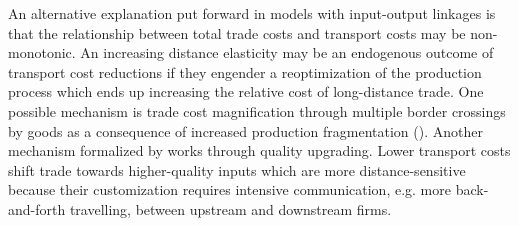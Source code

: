 \documentclass[12pt,twoside,a4paper,notitlepage]{article}
\begin{document}
An alternative explanation put forward in models with input-output linkages is that the relationship between total trade costs and transport costs may be non-monotonic. An increasing distance elasticity may be an endogenous outcome of transport cost reductions if they engender a reoptimization of the production process which ends up increasing the relative cost of long-distance trade. One possible mechanism is trade cost magnification through multiple border crossings by goods as a consequence of increased production fragmentation (\cite{Yi2010,Daudin2011,Noguera2012}). Another mechanism formalized by \cite{Duranton2008} works through quality upgrading. Lower transport costs shift trade towards higher-quality inputs which are more distance-sensitive because their customization requires intensive communication, e.g. more back-and-forth travelling, between upstream and downstream firms.
\end{document}
